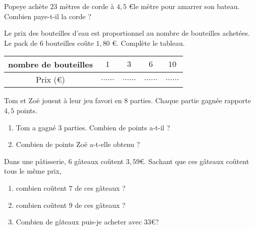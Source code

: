 \begin{pageParcoursd} 
 

Popeye achète $23$ mètres de corde à $4,5$ \euro le mètre pour amarrer son bateau. 
\vspace{0.2cm}
Combien paye-t-il la corde ? 

 

Le prix des bouteilles d'eau est proportionnel au nombre de bouteilles achetées. Le pack de $6$ bouteilles coûte $1,80$ \euro. Complète le tableau.
\begin{center}
\begin{tabular}{|c|c|c|c|c|}
\hline 
nombre de bouteilles & $1$ & $3$ & $6$ & $10$ \\ 
\hline 
Prix (\euro) & $\ldots\ldots$ & $\ldots\ldots$ & $\ldots\ldots$ & $\ldots\ldots$   \\ 
\hline 
\end{tabular} 
\end{center}


 

 
 
Tom et Zoë jouent à leur jeu favori en $8$ parties. Chaque partie gagnée rapporte $4,5$ points. 

\begin{enumerate}[leftmargin=*]
\item Tom a gagné $3$ parties. Combien de points a-t-il ?
\item Combien de points Zoë a-t-elle obtenu ? 
\end{enumerate}
 



  
  
Dans une pâtisserie, $6$ gâteaux coûtent $3,59$\euro. Sachant que ces gâteaux coûtent tous le même prix,

\begin{enumerate}[leftmargin=*]
\item combien coûtent $7$ de ces gâteaux ?  
\item combien coûtent $9$ de ces gâteaux ? 
\item Combien de gâteaux puis-je acheter avec $33$\euro ?  
\end{enumerate}
 
\end{pageParcoursd}
